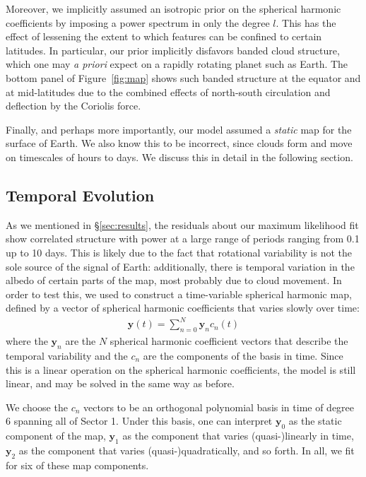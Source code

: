\documentclass[modern]{aastex62}
\begin{document}
Moreover, we implicitly assumed an isotropic prior on the spherical harmonic
coefficients by imposing a power spectrum in only the degree $l$. This has the
effect of lessening the extent to which features can be confined to certain
latitudes. In particular, our prior implicitly disfavors banded cloud structure,
which one may \emph{a priori} expect on a rapidly rotating planet such as 
Earth. The bottom panel of Figure~\ref{fig:map} shows such banded structure
at the equator and at mid-latitudes due to the combined effects of 
north-south circulation and deflection by the Coriolis force.

Finally, and perhaps more importantly, our model assumed a \emph{static}
map for the surface of Earth. We also know this to be incorrect, since
clouds form and move on timescales of hours to days. We discuss this in
detail in the following section.

\subsection{Temporal Evolution}
\label{sec:temporal}

As we mentioned in \S\ref{sec:results}, the residuals about our maximum
likelihood fit show correlated structure with power at a large range
of periods ranging from 0.1 up to 10 days. This is likely due to 
the fact that rotational variability is not the sole source of the
signal of Earth: additionally, there is temporal variation in the 
albedo of certain parts of the map, most probably due to cloud movement.
In order to test this, we used \starry to construct a time-variable
spherical harmonic map, defined by a vector of spherical harmonic coefficients
that varies slowly over time:
%
\begin{align}
    \mathbf{y}(t) = \sum_{n=0}^N \mathbf{y}_n c_n(t)
\end{align}
%
where the $\mathbf{y}_n$ are the $N$ spherical harmonic coefficient
vectors that describe the temporal variability and the $c_n$ are the components
of the basis in time. Since this is a linear operation on the spherical
harmonic coefficients, the \starry model is still linear, and may be
solved in the same way as before. 

We choose the $c_n$ vectors to be an orthogonal polynomial basis in time of 
degree 6 spanning all of Sector 1. Under this basis, one can 
interpret
$\mathbf{y}_0$ as the static component of the map, $\mathbf{y}_1$ as the
component that varies (quasi-)linearly in time, $\mathbf{y}_2$ as the component
that varies (quasi-)quadratically, and so forth. In all, we fit for six
of these map components.
\end{document}
